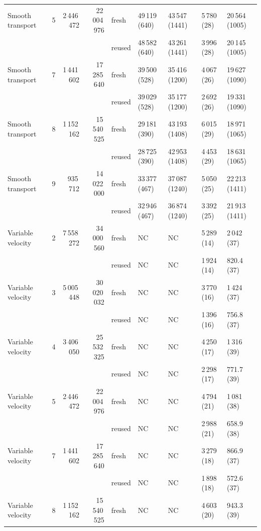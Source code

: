 \begin{tabular}{lrrrlllll}
\addlinespace[2pt]
Smooth transport & 5 & 2\,446\,472 & 22\,004\,976 & fresh & 49\,119 (640) & 43\,547 (1441) & 5\,780 (28) & 20\,564 (1005)\\
 & & &  & reused & 48\,582 (640) & 43\,261 (1441) & 3\,996 (28) & 20\,145 (1005)\\
\addlinespace[2pt]
Smooth transport & 7 & 1\,441\,602 & 17\,285\,640 & fresh & 39\,500 (528) & 35\,416 (1200) & 4\,067 (26) & 19\,627 (1090)\\
 & & &  & reused & 39\,029 (528) & 35\,177 (1200) & 2\,692 (26) & 19\,331 (1090)\\
\addlinespace[2pt]
Smooth transport & 8 & 1\,152\,162 & 15\,540\,525 & fresh & 29\,181 (390) & 43\,193 (1408) & 6\,015 (29) & 18\,971 (1065)\\
 & & &  & reused & 28\,725 (390) & 42\,953 (1408) & 4\,453 (29) & 18\,631 (1065)\\
\addlinespace[2pt]
Smooth transport & 9 & 935\,712 & 14\,022\,000 & fresh & 33\,377 (467) & 37\,087 (1240) & 5\,050 (25) & 22\,213 (1411)\\
 & & &  & reused & 32\,946 (467) & 36\,874 (1240) & 3\,392 (25) & 21\,913 (1411)\\
\addlinespace[2pt]
Variable velocity & 2 & 7\,558\,272 & 34\,000\,560 & fresh & NC & NC & 5\,289 (14) & 2\,042 (37)\\
 & & &  & reused & NC & NC & 1\,924 (14) & 820.4 (37)\\
\addlinespace[2pt]
Variable velocity & 3 & 5\,005\,448 & 30\,020\,032 & fresh & NC & NC & 3\,770 (16) & 1\,424 (37)\\
 & & &  & reused & NC & NC & 1\,396 (16) & 756.8 (37)\\
\addlinespace[2pt]
Variable velocity & 4 & 3\,406\,050 & 25\,532\,325 & fresh & NC & NC & 4\,250 (17) & 1\,316 (39)\\
 & & &  & reused & NC & NC & 2\,298 (17) & 771.7 (39)\\
\addlinespace[2pt]
Variable velocity & 5 & 2\,446\,472 & 22\,004\,976 & fresh & NC & NC & 4\,794 (21) & 1\,081 (38)\\
 & & &  & reused & NC & NC & 2\,988 (21) & 658.9 (38)\\
\addlinespace[2pt]
Variable velocity & 7 & 1\,441\,602 & 17\,285\,640 & fresh & NC & NC & 3\,279 (18) & 866.9 (37)\\
 & & &  & reused & NC & NC & 1\,898 (18) & 572.6 (37)\\
\addlinespace[2pt]
Variable velocity & 8 & 1\,152\,162 & 15\,540\,525 & fresh & NC & NC & 4\,603 (20) & 943.3 (39)\\

\end{tabular}
